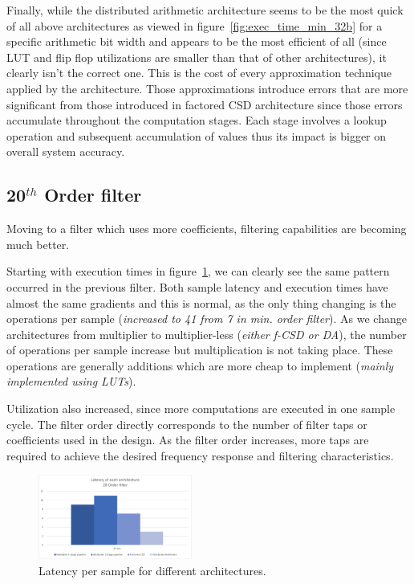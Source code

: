 Finally, while the distributed arithmetic architecture seems to be the most quick of all above architectures as viewed in figure~\ref{fig:exec_time_min_32b} for a specific arithmetic bit width and appears to be the most efficient of all (since LUT and flip flop utilizations are smaller than that of other architectures), it clearly isn't the correct one. This is the cost of every approximation technique applied by the architecture.
Those approximations introduce errors that are more significant from those introduced in factored CSD architecture since those errors accumulate throughout the computation stages. Each stage involves a lookup operation and subsequent accumulation of values thus its impact is bigger on overall system accuracy.

\subsection{20$^{th}$ Order filter}
Moving to a filter which uses more coefficients, filtering capabilities are becoming much better.

Starting with execution times in figure~\ref{fig:fir_20_hdl_latency}, we can clearly see the same pattern occurred in the previous filter. Both sample latency and execution times have almost the same gradients and this is normal, as the only thing changing is the operations per sample (\textit{increased to 41 from 7 in min. \hspace{-10pt} order filter}). As we change architectures from multiplier to multiplier-less (\textit{either f-CSD or DA}), the number of operations per sample increase but multiplication is not taking place. These operations are generally additions which are more cheap to implement (\textit{mainly implemented using LUTs}).

Utilization also increased, since more computations are executed in one sample cycle.
The filter order directly corresponds to the number of filter taps or coefficients used in the design. As the filter order increases, more taps are required to achieve the desired frequency response and filtering characteristics.

\begin{figure}[htpb]
	\centering
	\includegraphics[width=0.45\textwidth]{../Images/FIR_20_Order/hdl_latency.png}
	\caption{Latency per sample for different architectures.}
	\label{fig:fir_20_hdl_latency}
\end{figure}

